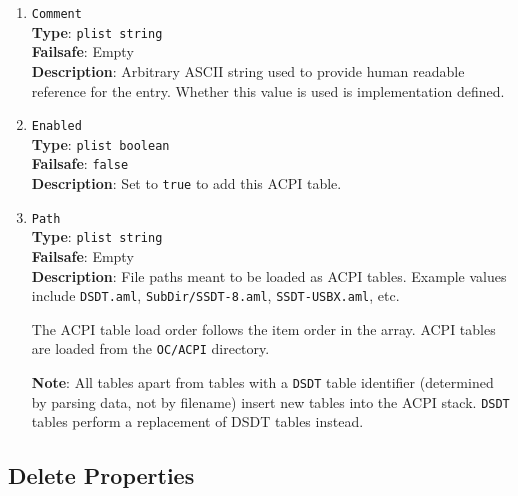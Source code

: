 \documentclass[]{article}
\makeatletter
\renewcommand{\label}[1]{%
\zref@wrapper@immediate{\oldlabel{#1}}}  %
\makeatother
\begin{document}
\begin{enumerate}

\item
  \texttt{Comment}\\
  \textbf{Type}: \texttt{plist\ string}\\
  \textbf{Failsafe}: Empty\\
  \textbf{Description}: Arbitrary ASCII string used to provide human readable
  reference for the entry. Whether this value is used is implementation defined.

\item
  \texttt{Enabled}\\
  \textbf{Type}: \texttt{plist\ boolean}\\
  \textbf{Failsafe}: \texttt{false}\\
  \textbf{Description}: Set to \texttt{true} to add this ACPI table.

\item
  \texttt{Path}\\
  \textbf{Type}: \texttt{plist\ string}\\
  \textbf{Failsafe}: Empty\\
  \textbf{Description}: File paths meant to be loaded as ACPI tables.
  Example values include \texttt{DSDT.aml}, \texttt{SubDir/SSDT-8.aml},
  \texttt{SSDT-USBX.aml}, etc.

  The ACPI table load order follows the item order in the array. ACPI tables
  are loaded from the \texttt{OC/ACPI} directory.

  \textbf{Note}: All tables apart from tables with a \texttt{DSDT} table identifier
  (determined by parsing data, not by filename) insert new tables into the ACPI stack.
  \texttt{DSDT} tables perform a replacement of DSDT tables instead.

\end{enumerate}

\subsection{Delete Properties}\label{acpipropsdelete}
\end{document}
